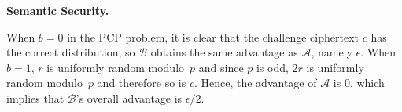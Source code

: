 \documentclass[a4paper, 12pt]{article}
\newenvironment{capsproof}[1][\proofname]{\proof[\scshape #1:]}{\endproof}
\newcommand{\mc}[1]{\mathcal{#1}}
\newcommand{\tbf}[1]{\textbf{#1}}
\newenvironment{bparagraph}[1]{
	\vspace{2ex}\noindent\tbf{#1. }\nolinebreak 
}{\vspace{2ex}}
\begin{document}
\begin{bparagraph}{Semantic Security}
\begin{capsproof}
			When $b = 0$ in the PCP problem, it is clear that the challenge ciphertext $c$ has the correct distribution, so $\mc{B}$ obtains the same advantage as $\mc{A}$, namely $\epsilon$.
			When $b = 1$, $r$ is uniformly random modulo~$p$ and since $p$ is odd, $2r$ is uniformly random modulo~$p$ and therefore so is $c$.
			Hence, the advantage of $\mc{A}$ is 0, which implies that $\mc{B}$'s overall advantage is $\epsilon/2$.
		\end{capsproof}
		
	\end{bparagraph}
	
	
\end{document}
